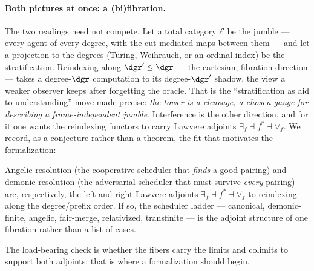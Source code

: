 \paragraph{Both pictures at once: a (bi)fibration.}
The two readings need not compete. Let a total category $\mathcal{E}$ be the
jumble --- every agent of every degree, with the cut-mediated maps between them ---
and let a projection to the degrees (Turing, Weihrauch, or an ordinal index) be
the stratification. Reindexing along $\dgr' \le \dgr$ --- the cartesian, fibration
direction --- takes a degree-$\dgr$ computation to its degree-$\dgr'$ shadow, the
view a weaker observer keeps after forgetting the oracle. That is the
``stratification as aid to understanding'' move made precise: \emph{the tower is a
cleavage, a chosen gauge for describing a frame-independent jumble}. Interference
is the other direction, and for it one wants the reindexing functors to carry
Lawvere adjoints $\exists_f \dashv f^{*} \dashv \forall_f$. We record, as a
conjecture rather than a theorem, the fit that motivates the formalization:

\begin{conjecture}\label{ndo:conj:adjoint}
Angelic resolution (the cooperative scheduler that \emph{finds} a good pairing)
and demonic resolution (the adversarial scheduler that must survive \emph{every}
pairing) are, respectively, the left and right Lawvere adjoints
$\exists_f \dashv f^{*} \dashv \forall_f$ to reindexing along the
degree/prefix order. If so, the scheduler ladder --- canonical, demonic-finite,
angelic, fair-merge, relativized, transfinite --- is the adjoint structure of one
fibration rather than a list of cases.
\end{conjecture}

\noindent
The load-bearing check is whether the fibers carry the limits and colimits to
support both adjoints; that is where a formalization should begin.

